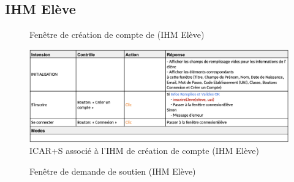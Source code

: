 \subsection{IHM Elève}

\begin{figure}[H]
    \centering
    \caption{Fenêtre de création de compte de (IHM Elève)}
\end{figure}

\begin{figure}[H]
    \centering
    \includegraphics[width=13cm]{ICARS/inscription.png}
    \caption{ICAR+S associé à l'IHM de création de compte (IHM Elève)}
\end{figure}

\begin{figure}[H]
    \centering
    \caption{Fenêtre de demande de soutien (IHM Elève)}
\end{figure}

